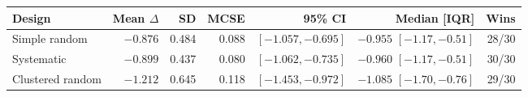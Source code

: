 \begin{tabular}{lrrrrrr}
\toprule
Design & Mean $\Delta$ & SD & MCSE & 95\% CI & Median [IQR] & Wins \\
\midrule
Simple random & $-0.876$ & 0.484 & 0.088 & $[-1.057, -0.695]$ & $-0.955$ $[-1.17, -0.51]$ & 28/30 \\
Systematic & $-0.899$ & 0.437 & 0.080 & $[-1.062, -0.735]$ & $-0.960$ $[-1.17, -0.51]$ & 30/30 \\
Clustered random & $-1.212$ & 0.645 & 0.118 & $[-1.453, -0.972]$ & $-1.085$ $[-1.70, -0.76]$ & 29/30 \\
\bottomrule
\end{tabular}
